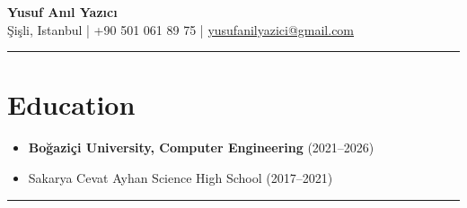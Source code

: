 \documentclass{article}
\renewcommand{\normalsize}{\fontsize{9}{11}\selectfont}
\begin{document}
\normalsize

\begin{center}
    {\Large \textbf{Yusuf Anıl Yazıcı}}\\[0.5em]
    Şişli, Istanbul \quad | \quad +90 501 061 89 75 \quad | \quad
    \href{mailto:yusufanilyazici@gmail.com}{yusufanilyazici@gmail.com}
\end{center}
\vspace{0.5em}

\hrule
\vspace{0.1em}
\section*{Education}
\vspace{-0.5em}
\begin{itemize}
    \item \textbf{Boğaziçi University, Computer Engineering} (2021--2026)
    \item Sakarya Cevat Ayhan Science High School (2017--2021)
\end{itemize}

\hrule
\vspace{0.1em}
\end{document}
